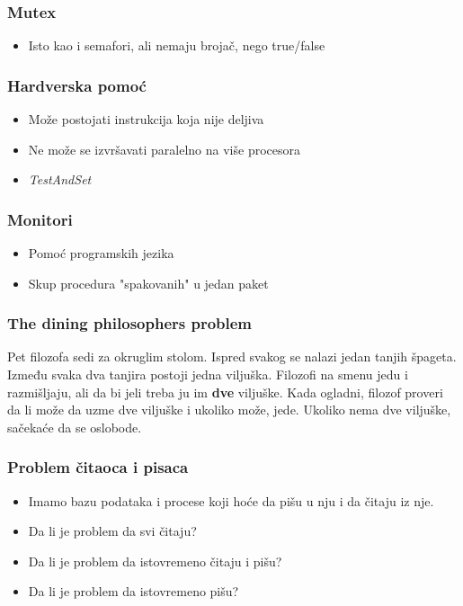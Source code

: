 \documentclass{beamer}
\begin{document}
\begin{frame}
    \frametitle{Mutex}
    \begin{itemize}
        \item Isto kao i semafori, ali nemaju brojač, nego true/false
    \end{itemize}
\end{frame}

\begin{frame}
    \frametitle{Hardverska pomoć}
    \begin{itemize}
        \item Može postojati instrukcija koja nije deljiva \newline
        \item Ne može se izvršavati paralelno na više procesora \newline
        \item \textit{TestAndSet}
    \end{itemize}
\end{frame}

\begin{frame}
    \frametitle{Monitori}
    \begin{itemize}
        \item Pomoć programskih jezika \newline
        \item Skup procedura "spakovanih" u jedan paket \newline
    \end{itemize}

\end{frame}

\begin{frame}
    \frametitle{The dining philosophers problem}
    \begin{center}
        \item Pet filozofa sedi za okruglim stolom. Ispred svakog se nalazi jedan tanjih špageta. Između svaka dva tanjira postoji jedna viljuška. Filozofi na smenu jedu i razmišljaju, ali da bi jeli treba ju im \textbf{dve} viljuške. Kada ogladni, filozof proveri da li može da uzme dve viljuške i ukoliko može, jede. Ukoliko nema dve viljuške, sačekaće da se oslobode.
    \end{center}
\end{frame}

\begin{frame}
    \frametitle{Problem čitaoca i pisaca}
    \begin{itemize}
        \item Imamo bazu podataka i procese koji hoće da pišu u nju i da čitaju iz nje. \newline
        \item Da li je problem da svi čitaju? \newline
        \item Da li je problem da istovremeno čitaju i pišu? \newline
        \item Da li je problem da istovremeno pišu?
    \end{itemize}
\end{frame}
\end{document}
